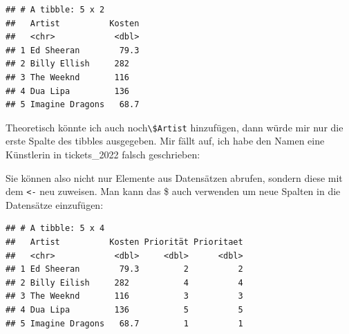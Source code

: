 \documentclass[
]{book}
\newenvironment{Shaded}{\begin{snugshade}}{\end{snugshade}}
\newcommand{\CommentTok}[1]{\textcolor[rgb]{0.56,0.35,0.01}{\textit{#1}}}
\newcommand{\DecValTok}[1]{\textcolor[rgb]{0.00,0.00,0.81}{#1}}
\newcommand{\FunctionTok}[1]{\textcolor[rgb]{0.00,0.00,0.00}{#1}}
\newcommand{\NormalTok}[1]{#1}
\newcommand{\OtherTok}[1]{\textcolor[rgb]{0.56,0.35,0.01}{#1}}
\newcommand{\SpecialCharTok}[1]{\textcolor[rgb]{0.00,0.00,0.00}{#1}}
\newcommand{\StringTok}[1]{\textcolor[rgb]{0.31,0.60,0.02}{#1}}
\theoremstyle{definition}
\theoremstyle{definition}
\theoremstyle{definition}
\theoremstyle{definition}
\theoremstyle{remark}
\begin{document}
\begin{verbatim}
## # A tibble: 5 x 2
##   Artist          Kosten
##   <chr>            <dbl>
## 1 Ed Sheeran        79.3
## 2 Billy Ellish     282  
## 3 The Weeknd       116  
## 4 Dua Lipa         136  
## 5 Imagine Dragons   68.7
\end{verbatim}

Theoretisch könnte ich auch noch\texttt{\textbackslash{}\$Artist} hinzufügen, dann würde mir nur die erste Spalte des tibbles ausgegeben. Mir fällt auf, ich habe den Namen eine Künstlerin in tickets\_2022 falsch geschrieben:

\begin{Shaded}
\end{Shaded}

Sie können also nicht nur Elemente aus Datensätzen abrufen, sondern diese mit dem \texttt{\textless{}-} neu zuweisen. Man kann das \$ auch verwenden um neue Spalten in die Datensätze einzufügen:

\begin{Shaded}
\end{Shaded}

\begin{verbatim}
## # A tibble: 5 x 4
##   Artist          Kosten Priorität Prioritaet
##   <chr>            <dbl>     <dbl>      <dbl>
## 1 Ed Sheeran        79.3         2          2
## 2 Billy Eilish     282           4          4
## 3 The Weeknd       116           3          3
## 4 Dua Lipa         136           5          5
## 5 Imagine Dragons   68.7         1          1
\end{verbatim}
\end{document}
